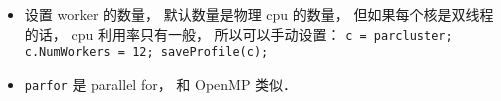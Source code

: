 
\begin{issues}
\issueDraft
\end{issues}

\begin{itemize}
\item 设置 worker 的数量， 默认数量是物理 cpu 的数量， 但如果每个核是双线程的话， cpu 利用率只有一般， 所以可以手动设置： \verb|c = parcluster; c.NumWorkers = 12; saveProfile(c);|
\item \verb|parfor| 是 parallel for， 和 OpenMP 类似．
\end{itemize}
